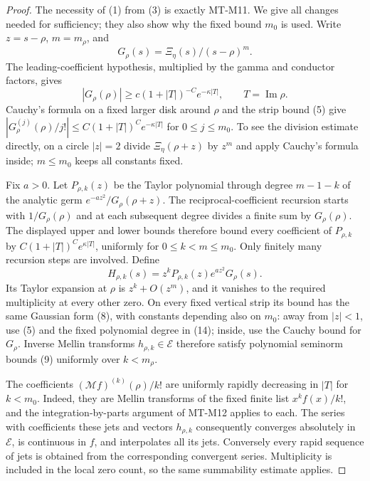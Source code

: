 \begin{proof}
The necessity of (1) from (3) is exactly MT-M11.
We give all changes needed for sufficiency; they also show why
the fixed bound $m_0$ is used.
Write $z=s-\rho$, $m=m_\rho$, and
\[
                  G_\rho(s)=\Xi_\eta(s)/(s-\rho)^m .
\]
The leading-coefficient hypothesis, multiplied by the gamma
and conductor factors, gives
\[
 |G_\rho(\rho)|\ge c(1+|T|)^{-C}e^{-\kappa|T|},
           \qquad T=\operatorname{Im}\rho.
\]
Cauchy's formula on a fixed larger disk around $\rho$ and
the strip bound (5) give
$|G_\rho^{(j)}(\rho)/j!|
 \le C(1+|T|)^C e^{-\kappa|T|}$ for $0\le j\le m_0$.
To see the division estimate directly, on a circle $|z|=2$
divide $\Xi_\eta(\rho+z)$ by $z^m$ and apply Cauchy's
formula inside; $m\le m_0$ keeps all constants fixed.

Fix $a>0$. Let $P_{\rho,k}(z)$ be the Taylor polynomial
through degree $m-1-k$ of the analytic germ
$e^{-az^2}/G_\rho(\rho+z)$.
The reciprocal-coefficient recursion starts with
$1/G_\rho(\rho)$ and at each subsequent degree divides
a finite sum by $G_\rho(\rho)$. The displayed upper and
lower bounds therefore bound every coefficient of
$P_{\rho,k}$ by
$C(1+|T|)^C e^{\kappa|T|}$, uniformly for
$0\le k<m\le m_0$. Only finitely many recursion steps
are involved. Define
\[
 H_{\rho,k}(s)=
      z^kP_{\rho,k}(z)e^{az^2}G_\rho(s).                \tag{14}
\]
Its Taylor expansion at $\rho$ is
$z^k+O(z^m)$, and it vanishes to the required multiplicity
at every other zero. On every fixed vertical strip its
bound has the same Gaussian form (8), with constants
depending also on $m_0$: away from $|z|<1$, use (5)
and the fixed polynomial degree in (14); inside,
use the Cauchy bound for $G_\rho$.
Inverse Mellin transforms $h_{\rho,k}\in\mathcal E$
therefore satisfy polynomial seminorm bounds (9)
uniformly over $k<m_\rho$.

The coefficients $(\mathcal Mf)^{(k)}(\rho)/k!$ are
uniformly rapidly decreasing in $|T|$ for
$k<m_0$. Indeed, they are Mellin transforms of the
fixed finite list $x^k f(x)/k!$, and the
integration-by-parts argument of MT-M12 applies to
each. The series with coefficients these jets and
vectors $h_{\rho,k}$ consequently converges absolutely
in $\mathcal E$, is continuous in $f$, and interpolates
all its jets. Conversely every rapid sequence of jets
is obtained from the corresponding convergent series.
Multiplicity is included in the local zero count,
so the same summability estimate applies.


\end{proof}

